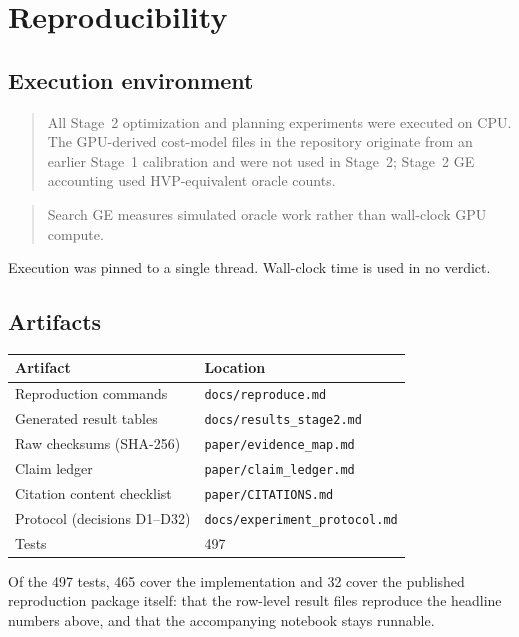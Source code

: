 \section{Reproducibility}
\label{sec:reproducibility}

\subsection{Execution environment}

\begin{quote}
All Stage~2 optimization and planning experiments were executed on CPU. The
GPU-derived cost-model files in the repository originate from an earlier Stage~1
calibration and were not used in Stage~2; Stage~2 GE accounting used HVP-equivalent
oracle counts.
\end{quote}

\begin{quote}
Search GE measures simulated oracle work rather than wall-clock GPU compute.
\end{quote}

Execution was pinned to a single thread. Wall-clock time is used in no verdict.

\subsection{Artifacts}

\begin{center}
\begin{tabular}{ll}
\toprule
Artifact & Location \\
\midrule
Reproduction commands       & \texttt{docs/reproduce.md} \\
Generated result tables     & \texttt{docs/results\_stage2.md} \\
Raw checksums (SHA-256)     & \texttt{paper/evidence\_map.md} \\
Claim ledger                & \texttt{paper/claim\_ledger.md} \\
Citation content checklist  & \texttt{paper/CITATIONS.md} \\
Protocol (decisions D1--D32) & \texttt{docs/experiment\_protocol.md} \\
Tests                       & 497 \\
\bottomrule
\end{tabular}
\end{center}

Of the 497 tests, 465 cover the implementation and 32 cover the published reproduction
package itself: that the row-level result files reproduce the headline numbers above, and
that the accompanying notebook stays runnable.

